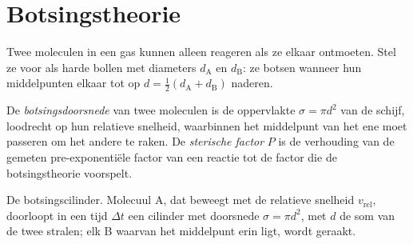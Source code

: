 \section{Botsingstheorie}

Twee moleculen in een gas kunnen alleen reageren als ze elkaar ontmoeten.
Stel ze voor als harde bollen met diameters $d_{\mathrm A}$ en $d_{\mathrm B}$:
ze botsen wanneer hun middelpunten elkaar tot op $d =
\frac12(d_{\mathrm A} + d_{\mathrm B})$ naderen.

\begin{definition}\label{def:b3:rate-theories:collision}
De \emph{botsingsdoorsnede} van twee moleculen
is de oppervlakte $\sigma = \pi d^2$ van de schijf, loodrecht op hun
relatieve snelheid, waarbinnen het middelpunt van het ene moet passeren om
het andere te raken. De
\emph{sterische factor} $P$ is de verhouding van de
gemeten pre-exponentiële factor van een reactie tot de factor die de
botsingstheorie voorspelt.
\end{definition}

\begin{omfigure}

{\small De botsingscilinder. Molecuul A, dat beweegt met de relatieve
snelheid $v_{\mathrm{rel}}$, doorloopt
in een tijd $\Delta t$ een cilinder met doorsnede $\sigma = \pi d^2$, met
$d$ de som van de twee stralen; elk B waarvan het middelpunt erin ligt,
wordt geraakt.}
\end{omfigure}

